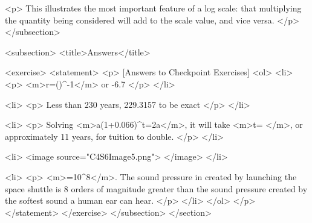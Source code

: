        <p>
            This illustrates the most important feature of a log scale: that multiplying the quantity being considered will add to the scale value, and vice versa.
        </p>
    </subsection>


    <subsection>
        <title>Answers</title>

        <exercise>
            <statement>
                <p>
                    [Answers to Checkpoint Exercises]
                    <ol>
                        <li>
                            <p>
                                <m>r=()^{}-1</m> or -6.7%
                            </p>
                        </li>

                        <li>
                            <p>
                                Less than 230 years, 229.3157 to be exact
                            </p>
                        </li>

                        <li>
                            <p>
                                Solving <m>a(1+0.066)^{t}=2a</m>, it will take <m>t= </m>, or approximately 11 years, for tuition to double.
                            </p>
                        </li>

                        <li>
                            <image source="C4S6Image5.png">
                            </image>
                        </li>

                        <li>
                            <p>
                                <m>=10^{8}</m>. The sound pressure in created by launching the space shuttle is 8 orders of magnitude greater than the sound pressure created by the softest sound a human ear can hear.
                            </p>
                        </li>
                    </ol>
                </p>
            </statement>
        </exercise>
    </subsection>
</section>